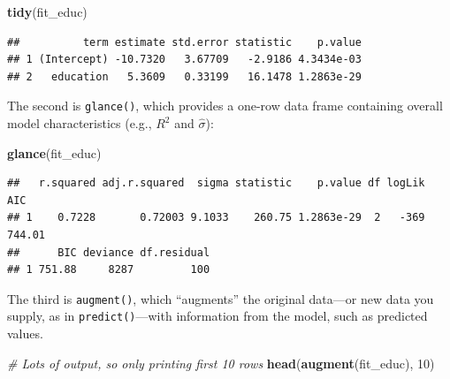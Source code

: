 \documentclass[12pt,oneside,openany]{book}
\newenvironment{Shaded}{\begin{snugshade}}{\end{snugshade}}
\newcommand{\KeywordTok}[1]{\textcolor[rgb]{0.13,0.29,0.53}{\textbf{{#1}}}}
\newcommand{\DecValTok}[1]{\textcolor[rgb]{0.00,0.00,0.81}{{#1}}}
\newcommand{\CommentTok}[1]{\textcolor[rgb]{0.56,0.35,0.01}{\textit{{#1}}}}
\newcommand{\NormalTok}[1]{{#1}}
\begin{document}
\begin{Shaded}
\begin{Highlighting}[]
\KeywordTok{tidy}\NormalTok{(fit_educ)}
\end{Highlighting}
\end{Shaded}

\begin{verbatim}
##          term estimate std.error statistic    p.value
## 1 (Intercept) -10.7320   3.67709   -2.9186 4.3434e-03
## 2   education   5.3609   0.33199   16.1478 1.2863e-29
\end{verbatim}

The second is \texttt{glance()}, which provides a one-row data frame
containing overall model characteristics (e.g., \(R^2\) and
\(\hat{\sigma}\)):

\begin{Shaded}
\begin{Highlighting}[]
\KeywordTok{glance}\NormalTok{(fit_educ)}
\end{Highlighting}
\end{Shaded}

\begin{verbatim}
##   r.squared adj.r.squared  sigma statistic    p.value df logLik    AIC
## 1    0.7228       0.72003 9.1033    260.75 1.2863e-29  2   -369 744.01
##      BIC deviance df.residual
## 1 751.88     8287         100
\end{verbatim}

The third is \texttt{augment()}, which ``augments'' the original
data---or new data you supply, as in \texttt{predict()}---with
information from the model, such as predicted values.

\begin{Shaded}
\begin{Highlighting}[]
\CommentTok{# Lots of output, so only printing first 10 rows}
\KeywordTok{head}\NormalTok{(}\KeywordTok{augment}\NormalTok{(fit_educ), }\DecValTok{10}\NormalTok{)}
\end{Highlighting}
\end{Shaded}
\end{document}
